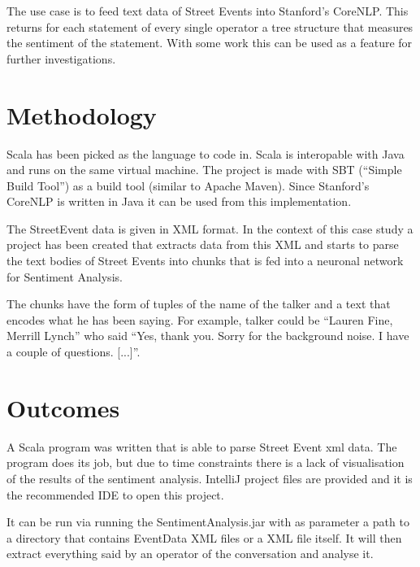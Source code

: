 \documentclass[twoside]{article}
\begin{document}
\begin{multicols}{2}
\par The use case is to feed text data of Street Events into Stanford's CoreNLP. This returns for each statement of every single operator a tree structure that measures the sentiment of the statement. With some work this can be used as a feature for further investigations.

\section{Methodology}

\par Scala has been picked as the language to code in. Scala is interopable with Java and runs on the same virtual machine. The project is made with SBT (``Simple Build Tool'') as a build tool (similar to Apache Maven). Since Stanford's CoreNLP is written in Java it can be used from this implementation. 

\par The StreetEvent data is given in XML format. In the context of this case study a project has been created that extracts data from this XML and starts to parse the text bodies of Street Events into chunks that is fed into a neuronal network for Sentiment Analysis. 

\par The chunks have the form of tuples of the name of the talker and a text that encodes what he has been saying. For example, talker could be ``Lauren Fine,  Merrill Lynch'' who said ``Yes, thank you. Sorry for the background noise. I have a couple of questions. [...]''.


\section{Outcomes}

\par A Scala program was written that is able to parse Street Event xml data. The program does its job, but due to time constraints there is a lack of visualisation of the results of the sentiment analysis. IntelliJ project files are provided and it is the recommended IDE to open this project.

\par It can be run via running the SentimentAnalysis.jar with as parameter a path to a directory that contains EventData XML files or a XML file itself. It will then extract everything said by an operator of the conversation and analyse it.


\end{multicols}
\end{document}
